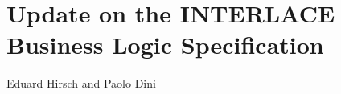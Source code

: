 \chapter{Update on the INTERLACE Business Logic Specification}
\label{ch:UpdateBLS}

\vspace{-1cm}
\begin{center}
Eduard Hirsch and Paolo Dini
\end{center}

